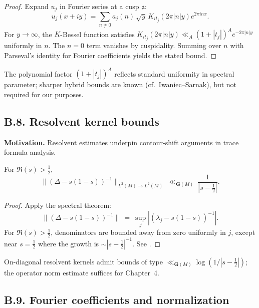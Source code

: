 \begin{proof}
Expand $u_j$ in Fourier series at a cusp $\mathfrak a$:
\[
u_j(x+iy)=\sum_{n\neq 0} a_j(n)\,\sqrt{y}\,K_{it_j}(2\pi|n|y)e^{2\pi i n x}.
\]
For $y\to\infty$, the $K$-Bessel function satisfies $K_{it_j}(2\pi |n| y)\ll_A (1+|t_j|)^A e^{-2\pi|n|y}$ uniformly in $n$. The $n=0$ term vanishes by cuspidality. Summing over $n$ with Parseval’s identity for Fourier coefficients yields the stated bound.
\end{proof}

\begin{remark}[Uniformity in $t_j$]\label{rem:B-cusp-uniform}
The polynomial factor $(1+|t_j|)^A$ reflects standard uniformity in spectral parameter; sharper hybrid bounds are known (cf.\ Iwaniec–Sarnak), but not required for our purposes.
\end{remark}

\bigskip
\subsection*{B.8. Resolvent kernel bounds}

\noindent
\textbf{Motivation.}
Resolvent estimates underpin contour-shift arguments in trace formula analysis.

\begin{lemma}\label{lem:B-resolvent}
For $\Re(s)>\tfrac12$,
\[
\|(\Delta-s(1-s))^{-1}\|_{L^2(M)\to L^2(M)}\ \ll_{\mathbf{G}(M)}\ \frac{1}{|s-\tfrac12|}.
\]
\end{lemma}

\begin{proof}
Apply the spectral theorem:  
\[
\|(\Delta-s(1-s))^{-1}\|\ =\ \sup_j |(\lambda_j-s(1-s))^{-1}|. 
\]
For $\Re(s)>\tfrac12$, denominators are bounded away from zero uniformly in $j$, except near $s=\tfrac12$ where the growth is $\sim |s-\tfrac12|^{-1}$. See \cite[Prop.~1.6]{Buser1992}.
\end{proof}

\begin{remark}\label{rem:B-resolvent-kernel}
On-diagonal resolvent kernels admit bounds of type $\ll_{\mathbf{G}(M)} \log(1/|s-\tfrac12|)$; the operator norm estimate suffices for Chapter~4.
\end{remark}

\bigskip
\subsection*{B.9. Fourier coefficients and normalization}

